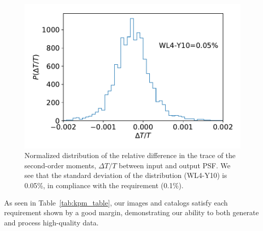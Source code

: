 \documentclass[\docopts]{\docclass}
\begin{document}
\begin{figure}
\centering
\includegraphics[width=0.85\columnwidth]{WL4-Y10}
\caption{Normalized distribution of the relative difference in the trace of the second-order moments, $\Delta T/T$ between input and output PSF. We see that the standard deviation of the distribution (WL4-Y10) is 0.05\%, in compliance with the requirement (0.1\%).}
\label{fig:WL4-Y10}
\end{figure}

As seen in Table~\ref{tab:kpm_table}, our images and catalogs satisfy each requirement shown by a good margin, demonstrating our ability to both generate and process high-quality data.
\end{document}
